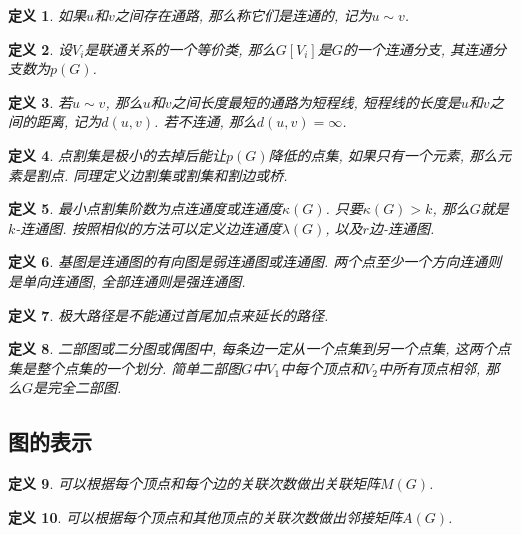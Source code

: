 \documentclass[UTF8,a4paper,11pt]{ctexart}
\newtheorem{definition}{定义}
\begin{document}
    \begin{definition}
      如果$u$和$v$之间存在通路, 那么称它们是连通的, 记为$u\sim v$.
    \end{definition}
    \begin{definition}
      设$V_i$是联通关系的一个等价类, 那么$G[V_i]$是$G$的一个连通分支,
      其连通分支数为$p\left(G\right)$.
    \end{definition}
    \begin{definition}
      若$u\sim v$, 那么$u$和$v$之间长度最短的通路为短程线,
      短程线的长度是$u$和$v$之间的距离, 记为$d \left(u, v\right)$.
      若不连通, 那么$d \left(u, v\right)=\infty$.
    \end{definition}
    \begin{definition}
      点割集是极小的去掉后能让$p\left(G\right)$降低的点集,
      如果只有一个元素, 那么元素是割点.
      同理定义边割集或割集和割边或桥.
    \end{definition}
    \begin{definition}
      最小点割集阶数为点连通度或连通度$\kappa\left(G\right)$.
      只要$\kappa\left(G\right)>k$, 那么$G$就是$k$-连通图.
      按照相似的方法可以定义边连通度$\lambda\left(G\right)$,
      以及$r$边-连通图.
    \end{definition}
    \begin{definition}
      基图是连通图的有向图是弱连通图或连通图.
      两个点至少一个方向连通则是单向连通图,
      全部连通则是强连通图.
    \end{definition}
    \begin{definition}
      极大路径是不能通过首尾加点来延长的路径.
    \end{definition}
    \begin{definition}
      二部图或二分图或偶图中,
      每条边一定从一个点集到另一个点集,
      这两个点集是整个点集的一个划分.
      简单二部图$G$中$V_1$中每个顶点和$V_2$中所有顶点相邻,
      那么$G$是完全二部图.
    \end{definition}
    \subsection{图的表示}
      \begin{definition}
        可以根据每个顶点和每个边的关联次数做出关联矩阵$M\left(G\right)$.
      \end{definition}
      \begin{definition}
        可以根据每个顶点和其他顶点的关联次数做出邻接矩阵$A\left(G\right)$.
      \end{definition}
\end{document}
